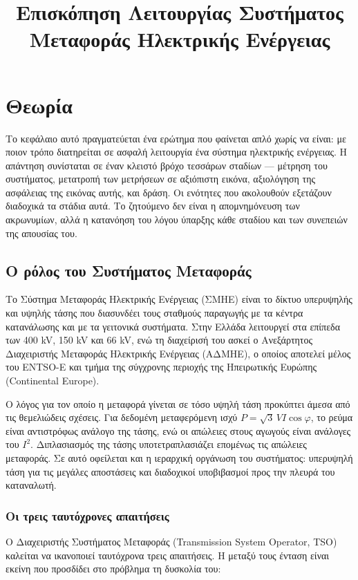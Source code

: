\title{Επισκόπηση Λειτουργίας Συστήματος Μεταφοράς Ηλεκτρικής Ενέργειας}

\section{Θεωρία}
\label{kef-01-theoria}

Το κεφάλαιο αυτό πραγματεύεται ένα ερώτημα που φαίνεται απλό χωρίς να είναι: με ποιον
τρόπο διατηρείται σε ασφαλή λειτουργία ένα σύστημα ηλεκτρικής ενέργειας. Η απάντηση
συνίσταται σε έναν κλειστό βρόχο τεσσάρων σταδίων — μέτρηση του συστήματος, μετατροπή των
μετρήσεων σε αξιόπιστη εικόνα, αξιολόγηση της ασφάλειας της εικόνας αυτής, και δράση. Οι
ενότητες που ακολουθούν εξετάζουν διαδοχικά τα στάδια αυτά. Το ζητούμενο δεν είναι η
απομνημόνευση των ακρωνυμίων, αλλά η κατανόηση του λόγου ύπαρξης κάθε σταδίου και των
συνεπειών της απουσίας του.

\subsection{Ο ρόλος του Συστήματος Μεταφοράς}

Το Σύστημα Μεταφοράς Ηλεκτρικής Ενέργειας (ΣΜΗΕ) είναι το δίκτυο υπερυψηλής και υψηλής
τάσης που διασυνδέει τους σταθμούς παραγωγής με τα κέντρα κατανάλωσης και με τα γειτονικά
συστήματα. Στην Ελλάδα λειτουργεί στα επίπεδα των 400 kV, 150 kV και 66 kV, ενώ τη
διαχείρισή του ασκεί ο Ανεξάρτητος Διαχειριστής Μεταφοράς Ηλεκτρικής Ενέργειας (ΑΔΜΗΕ), ο
οποίος αποτελεί μέλος του ENTSO-E και τμήμα της σύγχρονης περιοχής της Ηπειρωτικής Ευρώπης
(Continental Europe).

Ο λόγος για τον οποίο η μεταφορά γίνεται σε τόσο υψηλή τάση προκύπτει άμεσα από τις
θεμελιώδεις σχέσεις. Για δεδομένη μεταφερόμενη ισχύ $P = \sqrt{3}\,V I \cos\varphi$, το
ρεύμα είναι αντιστρόφως ανάλογο της τάσης, ενώ οι απώλειες στους αγωγούς είναι ανάλογες
του $I^2$. Διπλασιασμός της τάσης υποτετραπλασιάζει επομένως τις απώλειες μεταφοράς. Σε
αυτό οφείλεται και η ιεραρχική οργάνωση του συστήματος: υπερυψηλή τάση για τις μεγάλες
αποστάσεις και διαδοχικοί υποβιβασμοί προς την πλευρά του καταναλωτή.

\subsubsection*{Οι τρεις ταυτόχρονες απαιτήσεις}

Ο Διαχειριστής Συστήματος Μεταφοράς (Transmission System Operator, TSO) καλείται να
ικανοποιεί ταυτόχρονα τρεις απαιτήσεις. Η μεταξύ τους ένταση είναι εκείνη που προσδίδει
στο πρόβλημα τη δυσκολία του:

